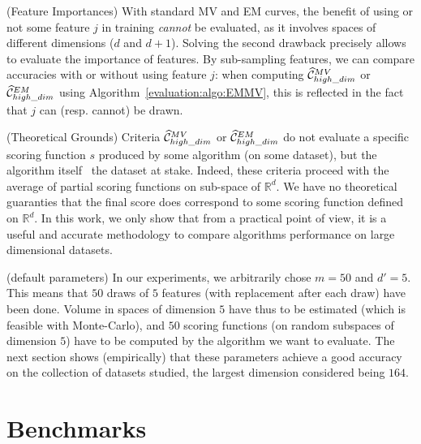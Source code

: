 \begin{remark}({\sc Feature Importances})
With standard MV and EM curves, the benefit of using or not some feature $j$ in training \emph{cannot} be evaluated, as it involves spaces of different dimensions ($d$ and $d+1$). %
%
Solving the second drawback precisely allows to evaluate the importance of features.
By sub-sampling features, we can compare accuracies with or without using feature $j$: when computing $\widehat{\mathcal{C}}^{MV}_{high\_dim}$ or $\widehat{\mathcal{C}}^{EM}_{high\_dim}$ using Algorithm~\ref{evaluation:algo:EMMV}, this is reflected in the fact that $j$ can (resp. cannot) be drawn.
\end{remark}

\begin{remark}({\sc Theoretical Grounds})
Criteria $\widehat{\mathcal{C}}^{MV}_{high\_dim}$ or $\widehat{\mathcal{C}}^{EM}_{high\_dim}$ do not evaluate a specific scoring function $s$ produced by some algorithm (on some dataset), but the algorithm itself \wrt~the dataset at stake. Indeed, these criteria proceed with the average of partial scoring functions on sub-space of $\mathbb{R}^d$. We have no theoretical guaranties that the final score does correspond to some scoring function defined on $\mathbb{R}^d$. In this work, we only show that from a practical point of view, it is a useful and accurate methodology to compare algorithms performance on large dimensional datasets.
\end{remark}

\begin{remark}({\sc default parameters}) 
In our experiments, we arbitrarily chose $m = 50$ and $d'=5$. This means that $50$ draws of $5$ features (with replacement after each draw) have been done. Volume in spaces of dimension $5$ have thus to be estimated (which is feasible with Monte-Carlo), and $50$ scoring functions (on random subspaces of dimension $5$) have to be computed by the algorithm we want to evaluate.
The next section shows (empirically) that these parameters achieve a good accuracy on the collection of datasets studied, the largest dimension considered being $164$.
\end{remark}

\section{Benchmarks}
\label{evaluation:sec:benchmarks}

